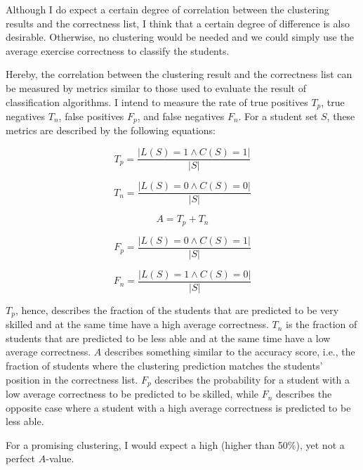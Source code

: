 Although I do expect a certain degree of correlation between the clustering results and the correctness list, I think that a certain degree of difference is also desirable. Otherwise, no clustering would be needed and we could simply use the average exercise correctness to classify the students.

Hereby, the correlation between the clustering result and the correctness list can be measured by metrics similar to those used to evaluate the result of classification algorithms. I intend to measure the rate of true positives $T_p$, true negatives $T_n$, false positives $F_p$, and false negatives $F_n$. For a student set $S$, these metrics are described by the following equations:

\begin{equation}
	T_p = \frac{|L(S)=1 \wedge C(S)=1|}{|S|}
\end{equation}

\begin{equation}
	T_n = \frac{|L(S)=0 \wedge C(S)=0|}{|S|}
\end{equation}

\begin{equation}
	A = T_p + T_n
\end{equation}

\begin{equation}
	F_p = \frac{|L(S)=0 \wedge C(S)=1|}{|S|}
\end{equation}

\begin{equation}
	F_n = \frac{|L(S)=1 \wedge C(S)=0|}{|S|}
\end{equation}

$T_p$, hence, describes the fraction of the students that are predicted to be very skilled and at the same time have a high average correctness. $T_n$ is the fraction of students that are predicted to be less able and at the same time have a low average correctness. $A$ describes something similar to the accuracy score, i.e., the fraction of students where the clustering prediction matches the students' position in the correctness list. $F_p$ describes the probability for a student with a low average correctness to be predicted to be skilled, while $F_n$ describes the opposite case where a student with a high average correctness is predicted to be less able.

For a promising clustering, I would expect a high (higher than 50\%), yet not a perfect $A$-value.
 